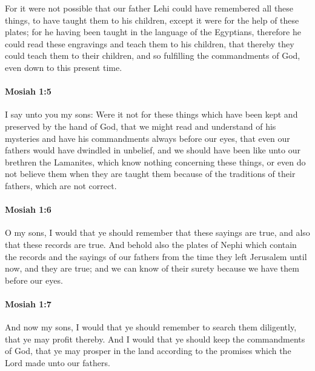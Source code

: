 			For it were not possible
			that our father Lehi could have remembered all these things,
			to have taught them to his children,
			except it were for the help of these plates;
			for he having been taught in the language of the Egyptians,
			therefore he could read these engravings and teach them to his children,
			that thereby they could teach them to their children,
			and so fulfilling the commandments of God, even down to this present time.

		\paragraph{Mosiah 1:5} %
			\label{MOSIAH-1-5}

			I say unto you my sons:
			Were it not for these things
			which have been kept and preserved by the hand of God,
			that we might read and understand of his mysteries
			and have his commandments always before our eyes,
			that even our fathers would have dwindled in unbelief,
			and we should have been like unto our brethren the Lamanites,
			which know nothing concerning these things,
			or even do not believe them when they are taught them
			because of the traditions of their fathers, which are not correct.

		\paragraph{Mosiah 1:6} %
			\label{MOSIAH-1-6}

			O my sons, I would that ye should remember
			that these sayings are true,
			and also that these records are true.
			And behold also the plates of Nephi
			which contain the records and the sayings of our fathers
			from the time they left Jerusalem until now,
			and they are true;
			and we can know of their surety
			because we have them before our eyes.

		\paragraph{Mosiah 1:7} %
			\label{MOSIAH-1-7}

			And now my sons, I would that ye should remember to search them diligently,
			that ye may profit thereby.
			And I would that ye should keep the commandments of God,
			that ye may prosper in the land
			according to the promises which the Lord made unto our fathers.

